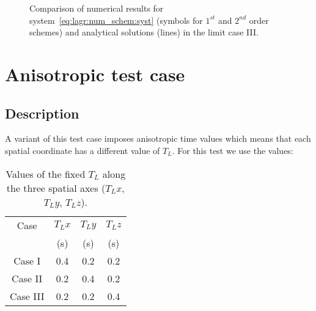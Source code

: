 \begin{figure}[H]
  \centering
  \caption{Comparison of numerical results for system~\ref{eq:lagr:num_schem:syst} (symbols for $1^{st}$ and $2^{nd}$ order schemes) and analytical solutions (lines) in the limit case III.}
  \label{Fig_NUM_SCHEME_LIMIT_CASE_III}
\end{figure}

\section{Anisotropic test case}
\subsection{Description}
A variant of this test case imposes anisotropic time values which means that each spatial coordinate has a different value of $T_L$. For this test we use the values:

\begin{table}[H]
    \begin{center}
        \begin{tabular}{|c|c|c|c|}
            \hline
            Case 		& $T_Lx$  & $T_Ly$  & $T_Lz$ \\
                		& (s)	  & (s)     & (s)    \\
            \hline
            Case I	    & 0.4    & 0.2    & 0.2	     \\
            \hline
            Case II	    & 0.2    & 0.4    & 0.2	     \\
            \hline
            Case III	& 0.2    & 0.2    & 0.4	     \\
            \hline
        \end{tabular}
        \caption{Values of the fixed $T_L$ along the three spatial axes ($T_Lx$, $T_Ly$, $T_Lz$).}
        \label{Tab_NUM_SCHEME_ANISO_cases}
    \end{center}
\end{table}

